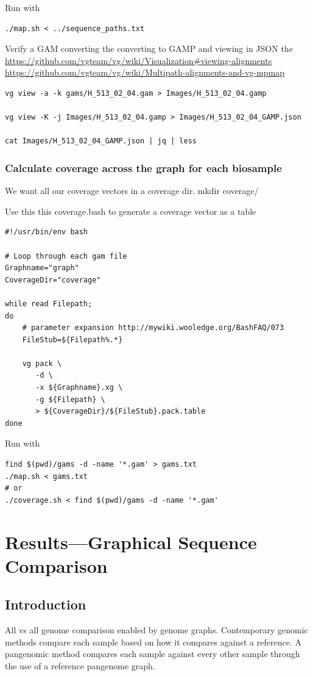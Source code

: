 \documentclass[10pt, a4paper]{article}
\begin{document}
Run with

\begin{verbatim}
./map.sh < ../sequence_paths.txt
\end{verbatim}

Verify a GAM converting the converting to GAMP and viewing in JSON the
\url{https://github.com/vgteam/vg/wiki/Visualization\#viewing-alignments}
\url{https://github.com/vgteam/vg/wiki/Multipath-alignments-and-vg-mpmap}

\begin{verbatim}
vg view -a -k gams/H_513_02_04.gam > Images/H_513_02_04.gamp

vg view -K -j Images/H_513_02_04.gamp > Images/H_513_02_04_GAMP.json

cat Images/H_513_02_04_GAMP.json | jq | less
\end{verbatim}
\subsubsection{Calculate coverage across the graph for each biosample}
\label{sec:org94e2a9e}
We want all our coverage vectors in a coverage dir.
mkdir coverage/

Use this this coverage.bash to generate a coverage vector as a table

\begin{verbatim}
#!/usr/bin/env bash

# Loop through each gam file
Graphname="graph"
CoverageDir="coverage"

while read Filepath;
do
    # parameter expansion http://mywiki.wooledge.org/BashFAQ/073
    FileStub=${Filepath%.*}

    vg pack \
       -d \
       -x ${Graphname}.xg \
       -g ${Filepath} \
       > ${CoverageDir}/${FileStub}.pack.table
done
\end{verbatim}

Run with

\begin{verbatim}
find $(pwd)/gams -d -name '*.gam' > gams.txt
./map.sh < gams.txt
# or
./coverage.sh < find $(pwd)/gams -d -name '*.gam'
\end{verbatim}
\section{Results---Graphical Sequence Comparison}
\label{sec:orge85cbcd}
\subsection{Introduction}
\label{sec:org5435b48}
All vs all genome comparison enabled by genome graphs.
Contemporary genomic methods compare each sample based on how it compares against a reference.
A pangenomic method compares each sample against every other sample through the use of a reference pangenome graph. 
\end{document}
